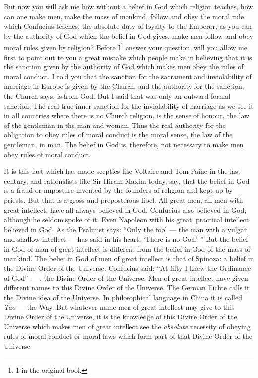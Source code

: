 But now you will ask me how without a belief in God which religion teaches, how can one make men, make the mass of mankind, follow and obey the moral rule which Confucius teaches, the absolute duty of loyalty to the Emperor, as you can by the authority of God which the belief in God gives, make men follow and obey moral rules given by religion?
Before I\footnote{1 in the original book} answer your question, will you allow me first to point out to you a great mistake which people make in believing that it is the sanction given by the authority of God which makes men obey the rules of moral conduct.
I told you that the sanction for the sacrament and inviolability of marriage in Europe is given by the Church, and the authority for the sanction, the Church says, is from God.
But I said that was only an outward formal sanction.
The real true inner sanction for the inviolability of marriage as we see it in all countries where there is no Church religion, is the sense of honour, the law of the gentleman in the man and woman.
Thus the real authority for the obligation to obey rules of moral conduct is the moral sense, the law of the gentleman, in man.
The belief in God is, therefore, not necessary to make men obey rules of moral conduct.

It is this fact which has made sceptics like Voltaire and Tom Paine in the last century, and rationalists like Sir Hiram Maxim today, say, that the belief in God is a fraud or imposture invented by the founders of religion and kept up by priests.
But that is a gross and preposterous libel.
All great men, all men with great intellect, have all always believed in God.
Confucius also believed in God, although he seldom spoke of it.
Even Napoleon with his great, practical intellect believed in God.
As the Psalmist says: ``Only the fool --- the man with a vulgar and shallow intellect --- has said in his heart, `There is no God.' ''
But the belief in God of man of great intellect is different from the belief in God of the mass of mankind.
The belief in God of men of great intellect is that of Spinoza: a belief in the Divine Order of the Universe.
Confucius said: ``At fifty I knew the Ordinance of God''\cite{num16} --- \ie, the Divine Order of the Universe.
Men of great intellect have given different names to this Divine Order of the Universe.
The German Fichte calls it the Divine idea of the Universe.
In philosophical language in China it is called \emph{Tao} --- the Way.
But whatever name men of great intellect may give to this Divine Order of the Universe, it is the knowledge of this Divine Order of the Universe which makes men of great intellect see the \emph{absolute} necessity of obeying rules of moral conduct or moral laws which form part of that Divine Order of the Universe.

